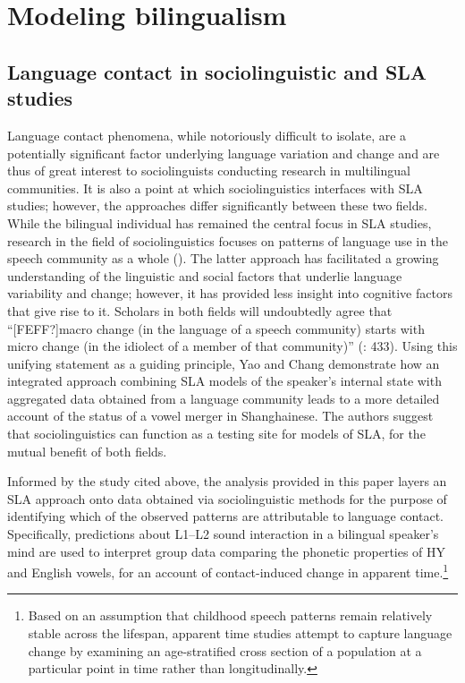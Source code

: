 \documentclass[output=paper]{langsci/langscibook}
\begin{document}
\section{Modeling bilingualism}
\label{sec:nove:3}

 
\subsection{Language contact in sociolinguistic and SLA studies} 
\label{sec:nove:3.1}


Language contact phenomena, while notoriously difficult to isolate, are a potentially significant factor underlying language variation and change and are thus of great interest to sociolinguists conducting research in multilingual communities. It is also a point at which sociolinguistics interfaces with SLA studies; however, the approaches differ significantly between these two fields. While the bilingual individual has remained the central focus in SLA studies, research in the field of sociolinguistics focuses on patterns of language use in the speech community as a whole (\citealt{YaoChang2016, Sankoff2002}). The latter approach has facilitated a growing understanding of the linguistic and social factors that underlie language variability and change; however, it has provided less insight into cognitive factors that give rise to it. Scholars in both fields will undoubtedly agree that “[FEFF?]macro change (in the language of a speech community) starts with micro change (in the idiolect of a member of that community)” (\citealt{YaoChang2016}: 433). Using this unifying statement as a guiding principle, Yao and Chang demonstrate how an integrated approach combining SLA models of the speaker’s internal state with aggregated data obtained from a language community leads to a more detailed account of the status of a vowel merger in Shanghainese. The authors suggest that sociolinguistics can function as a testing site for models of SLA, for the mutual benefit of both fields.

Informed by the study cited above, the analysis provided in this paper layers an SLA approach onto data obtained via sociolinguistic methods for the purpose of identifying which of the observed patterns are attributable to language contact. Specifically, predictions about L1--L2 sound interaction in a bilingual speaker’s mind are used to interpret group data comparing the phonetic properties of HY and English vowels, for an account of contact-induced change in apparent time.\footnote{Based on an assumption that childhood speech patterns remain relatively stable across the lifespan, apparent time studies attempt to capture language change by examining an age-stratified cross section of a population at a particular point in time rather than longitudinally.} 
\end{document}
